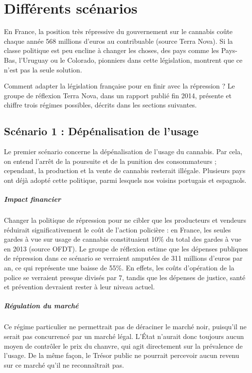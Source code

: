\chapter{Différents scénarios}

En France, la position très répressive du gouvernement sur le cannabis coûte chaque année 568 millions d’euros au contribuable (source Terra Nova). Si la classe politique est peu encline à changer les choses, des pays comme les Pays-Bas, l’Uruguay ou le Colorado, pionniers dans cette législation, montrent  que ce n’est pas la seule solution.

Comment adapter la législation française pour en finir avec la répression ? Le groupe de réflexion Terra Nova, dans un rapport publié fin 2014, présente et chiffre trois régimes possibles, décrits dans les sections suivantes.

\section{Scénario 1 : Dépénalisation de l’usage}

    Le premier scénario concerne la dépénalisation de l’usage du cannabis. Par cela, on entend l’arrêt de la poursuite et de la punition des consommateurs ; cependant, la production et la vente de cannabis resterait illégale. Plusieurs pays ont déjà adopté cette politique, parmi lesquels nos voisins portugais et espagnols.

    \paragraph{Impact financier} Changer la politique de répression pour ne cibler que les producteurs et vendeurs réduirait significativement le coût de l’action policière : en France, les seules gardes à vue sur usage de cannabis constituaient 10\% du total des gardes à vue en 2013 (source OFDT). Le groupe de réflexion estime que les dépenses publiques de répression dans ce scénario se verraient amputées de 311 millions d’euros par an, ce qui représente une baisse de 55\%. En effets, les coûts d’opération de la police se verraient presque divisés par 7, tandis que les dépenses de justice, santé et prévention devraient rester à leur niveau actuel.
    
     \paragraph{Régulation du marché} Ce régime particulier ne permettrait pas de déraciner le marché noir, puisqu’il ne serait pas concurrencé par un marché légal. L’État n’aurait donc toujours aucun moyen de contrôler le prix du chanvre, qui agit directement sur la prévalence de l’usage. De la même façon, le Trésor public ne pourrait percevoir aucun revenu sur ce marché qu’il ne reconnaîtrait pas. 

